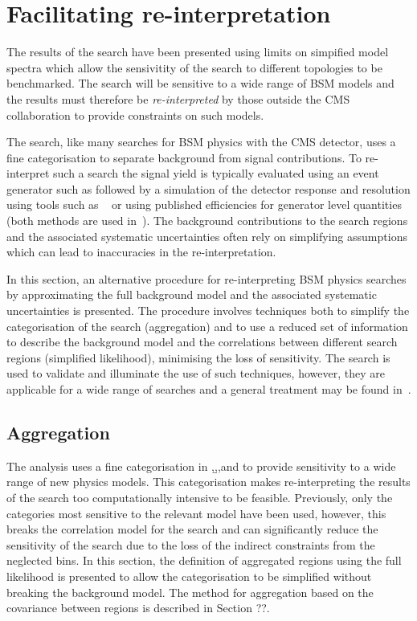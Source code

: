 \chapter{Facilitating re-interpretation} %
The results of the \alphat search have been presented using limits on simpified model
spectra which allow the sensivitity of the search to different topologies 
to be benchmarked. The search will be sensitive to a wide range of BSM models
and the results must therefore be \emph{re-interpreted} by those outside the 
CMS collaboration to provide constraints on such models.

The \alphat search, like many searches for BSM physics with the CMS detector, uses a 
fine categorisation to separate background from signal contributions. To re-interpret
such a search the signal yield is typically evaluated using an event generator such as \PYTHIA 
followed by a simulation of the detector response and resolution using tools 
such as \DELPHES~\cite{delphes} or using published efficiencies for generator
level quantities (both methods are used in~\cite{Drees:2013wra,Papucci:2014rja,mastercode}).
The background contributions to the search regions and the associated systematic uncertainties often rely
on simplifying assumptions which can lead to inaccuracies in the re-interpretation. 

In this section, an alternative procedure for re-interpreting BSM physics searches by approximating
the full background model and the associated systematic uncertainties is presented. 
The procedure involves techniques both to simplify the categorisation of the search (aggregation)
and to use a reduced set of information to describe the background model 
and the correlations between different search regions (simplified likelihood),
minimising the loss of sensitivity. The \alphat search is used to validate and illuminate
the use of such techniques, however, they are applicable for a wide range of 
searches and a general treatment may be found in~\cite{simp-lik}.

\section{Aggregation}%
The \alphat analysis uses a fine categorisation in \njet,\b,\scalht,and \mht to provide
sensitivity to a wide range of new physics models. This categorisation makes re-interpreting
the results of the search too computationally intensive to be feasible. Previously, 
only the categories most sensitive to the relevant model have been used, however,
this breaks the correlation model for the search and can significantly reduce
the sensitivity of the search due to the loss of the indirect constraints from
the neglected bins. In this section, the definition of aggregated regions 
using the full likelihood is presented to allow the categorisation to be 
simplified without breaking the background model. The method for aggregation based
on the covariance between regions is described in Section ??.

